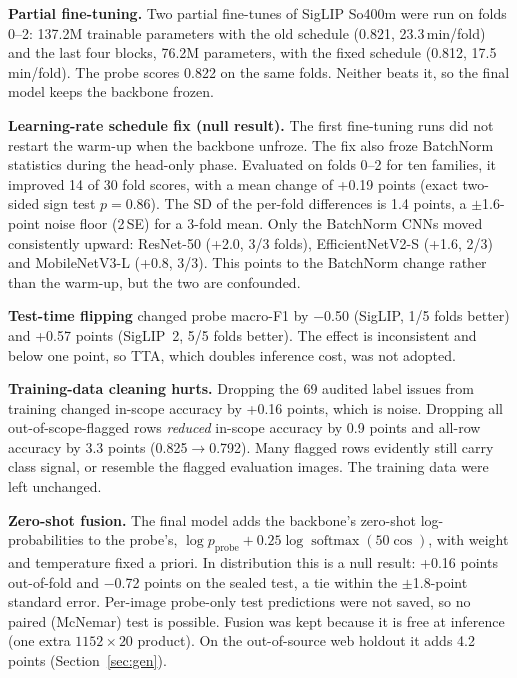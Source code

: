 \documentclass[conference]{IEEEtran}
\begin{document}
\textbf{Partial fine-tuning.} Two partial fine-tunes of SigLIP So400m were run on folds 0--2: 137.2M trainable
parameters with the old schedule (0.821, 23.3\,min/fold) and the last four blocks, 76.2M parameters, with the fixed
schedule (0.812, 17.5\,min/fold). The probe scores 0.822 on the same folds. Neither beats it, so the final model keeps
the backbone frozen.

\textbf{Learning-rate schedule fix (null result).} The first fine-tuning runs did not restart the warm-up when the
backbone unfroze. The fix also froze BatchNorm statistics during the head-only phase. Evaluated on folds 0--2 for ten
families, it improved 14 of 30 fold scores, with a mean change of +0.19 points (exact two-sided sign test $p=0.86$).
The SD of the per-fold differences is 1.4 points, a $\pm$1.6-point noise floor (2\,SE) for a 3-fold mean. Only the
BatchNorm CNNs moved consistently upward: ResNet-50 (+2.0, 3/3 folds), EfficientNetV2-S (+1.6, 2/3) and
MobileNetV3-L (+0.8, 3/3). This points to the BatchNorm change rather than the warm-up, but the two are confounded.

\textbf{Test-time flipping} changed probe macro-F1 by $-$0.50 (SigLIP, 1/5 folds better) and +0.57 points
(SigLIP~2, 5/5 folds better). The effect is inconsistent and below one point, so TTA, which doubles inference cost,
was not adopted.

\textbf{Training-data cleaning hurts.} Dropping the 69 audited label issues from training changed in-scope accuracy
by +0.16 points, which is noise. Dropping all out-of-scope-flagged rows \emph{reduced} in-scope accuracy by 0.9 points
and all-row accuracy by 3.3 points (0.825$\to$0.792). Many flagged rows evidently still carry class signal, or
resemble the flagged evaluation images. The training data were left unchanged.

\textbf{Zero-shot fusion.} The final model adds the backbone's zero-shot log-probabilities to the probe's,
$\log p_\text{probe} + 0.25\log\operatorname{softmax}(50\cos)$, with weight and temperature fixed a priori. In
distribution this is a null result: +0.16 points out-of-fold and $-$0.72 points on the sealed test, a tie within
the $\pm$1.8-point standard error. Per-image probe-only test predictions were not saved, so no paired (McNemar) test is
possible. Fusion was kept because it is free at inference (one extra $1152\times20$ product). On the out-of-source
web holdout it adds 4.2 points (Section~\ref{sec:gen}).

\end{document}
